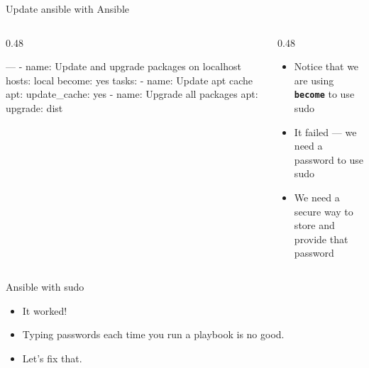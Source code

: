 \documentclass[aspectratio=169,12pt]{beamer}
\begin{document}
\begin{frame}[fragile]{Update ansible with Ansible}
\begin{columns}[T]
\begin{column}{0.48\textwidth}
\begin{codeyaml}
---
- name: Update and upgrade packages
    on localhost
  hosts: local
  become: yes  tasks:
    - name: Update apt cache
      apt:
        update_cache: yes
    - name: Upgrade all packages
      apt:
        upgrade: dist
\end{codeyaml}
\end{column}
\begin{column}{0.48\textwidth}
\begin{itemize}
  \item Notice that we are using \textbf{\texttt{become}} to use sudo
  \item It failed --- we need a password to use sudo
  \item We need a secure way to store and provide that password
\end{itemize}
\end{column}
\end{columns}
\vspace{0.2cm}
\end{frame}

\begin{frame}[fragile]{Ansible with sudo}
\vspace{0.3cm}
\begin{itemize}
  \item It worked!
  \item Typing passwords each time you run a playbook is no good.
  \item Let's fix that.
\end{itemize}
\end{frame}
\end{document}
